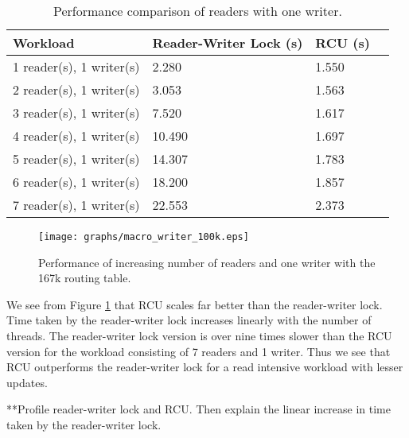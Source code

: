 \begin{table}[tph]
\begin{center}
\begin{tabular}{|l|l|l|l|}
\hline Workload &Reader-Writer Lock (s) & RCU (s) \\
\hline 1 reader(s), 1 writer(s) & 2.280 & 1.550\\
\hline 2 reader(s), 1 writer(s) & 3.053 & 1.563\\
\hline 3 reader(s), 1 writer(s) & 7.520 & 1.617\\
\hline 4 reader(s), 1 writer(s) & 10.490 & 1.697\\
\hline 5 reader(s), 1 writer(s) & 14.307 & 1.783\\
\hline 6 reader(s), 1 writer(s) & 18.200 & 1.857\\
\hline 7 reader(s), 1 writer(s) & 22.553 & 2.373\\
\hline
\end{tabular}
\end{center}
\label{tbl:167kwriter}
\caption{Performance comparison of readers with one writer.}
\end{table}


\begin{figure}[tph]
\texttt{[image: graphs/macro\_writer\_100k.eps]}
\caption{Performance of increasing number of readers and one writer with the 167k routing table.}
\label{chart:167kwriter}
\end{figure}
 
We see from Figure \ref{chart:167kwriter} that RCU scales far better than the reader-writer lock. Time taken by the reader-writer lock increases linearly with the number of threads. The reader-writer lock version is over nine times slower than the RCU version for the workload consisting of 7 readers and 1 writer. Thus we see that RCU outperforms the reader-writer lock for a read intensive workload with lesser updates.

**Profile reader-writer lock and RCU. Then explain the linear increase in time taken by the reader-writer lock.
